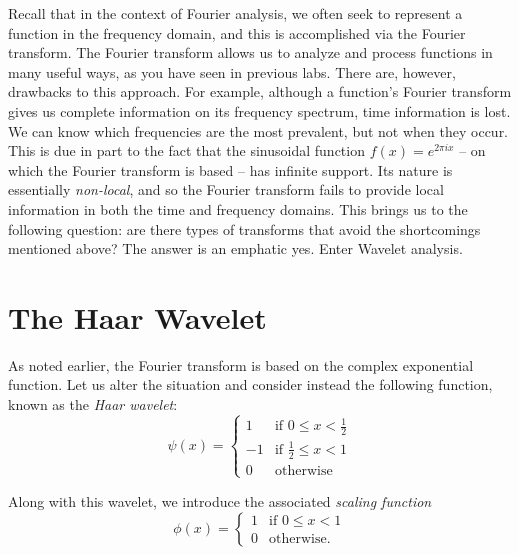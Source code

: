 

Recall that in the context of Fourier analysis, we often seek to represent a
function in the frequency domain, and this is accomplished via the Fourier
transform. The Fourier transform allows us to analyze and process functions
in many useful ways, as you have seen in previous labs. There are, however,
drawbacks to this approach. For example, although a function's Fourier
transform gives us complete information on its frequency spectrum, time
information is lost. We can know which frequencies are the
most prevalent, but not when they occur. This is due in part to the fact that
the sinusoidal function $f(x) = e^{2\pi ix}$ -- on which the Fourier transform
is based -- has infinite support. Its nature is essentially \emph{non-local},
and so the Fourier transform fails to provide local information in both the
time and frequency domains. This brings us to the following question: are
there types of transforms that avoid the shortcomings mentioned above? The
answer is an emphatic yes. Enter Wavelet analysis.

\section*{The Haar Wavelet}

As noted earlier, the Fourier transform is based on the complex exponential
function. Let us alter the situation and consider instead the following
function, known as the \emph{Haar wavelet}:
\begin{equation*}
\psi(x) =
 \begin{cases}
  1 & \text{if } 0 \leq x < \frac{1}{2} \\
  -1 & \text{if } \frac{1}{2} \leq x < 1 \\
  0 & \text{otherwise}
 \end{cases}
\end{equation*}


Along with this wavelet, we introduce the associated \emph{scaling function} 
\begin{equation*}
\phi(x) = 
 \begin{cases}
 1 & \text{if } 0 \leq x < 1 \\
 0 & \text{otherwise.}
 \end{cases}
\end{equation*}

